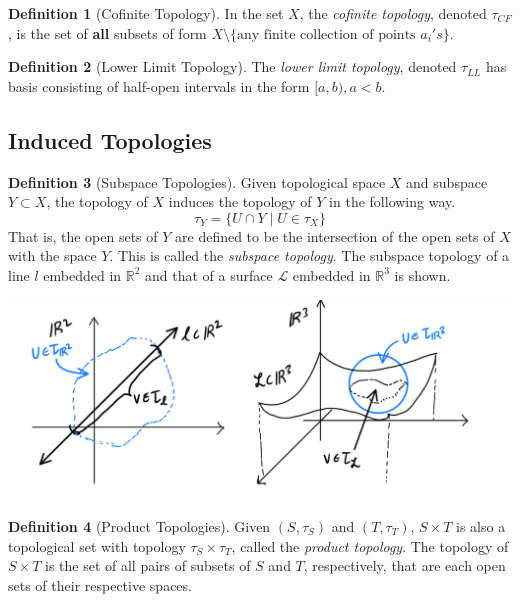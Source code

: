 \documentclass{article}
\theoremstyle{remark}
\theoremstyle{definition}
\newtheorem{definition}{Definition}[section]
\begin{document}
\begin{definition}[Cofinite Topology]
In the set $X$, the \textit{cofinite topology}, denoted $\tau_{CF}$, is the set of \textbf{all} subsets of form $X \setminus \{\text{any finite collection of points $a_{i}'s$}\}$. 
\end{definition}

\begin{definition}[Lower Limit Topology]
The \textit{lower limit topology}, denoted $\tau_{LL}$ has basis consisting of half-open intervals in the form $[a, b), a<b$. 
\end{definition}

\subsection{Induced Topologies}
\begin{definition}[Subspace Topologies]
Given topological space $X$ and subspace $Y \subset X$, the topology of $X$ induces the topology of $Y$ in the following way. 
\[\tau_Y = \{U \cap Y\;|\; U \in \tau_X\}\]
That is, the open sets of $Y$ are defined to be the intersection of the open sets of $X$ with the space $Y$. This is called the \textit{subspace topology}. The subspace topology of a line $l$ embedded in $\mathbb{R}^2$ and that of a surface $\mathcal{L}$ embedded in $\mathbb{R}^3$ is shown. 
\begin{center}
    \includegraphics[scale=0.25]{img/Subspace_Topology.PNG}
\end{center}
\end{definition}

\begin{definition}[Product Topologies]
Given $(S, \tau_{S})$ and $(T, \tau_{T})$, $S \times T$ is also a topological set with topology $\tau_S \times \tau_{T}$, called the \textit{product topology}. The topology of $S \times T$ is the set of all pairs of subsets of $S$ and $T$, respectively, that are each open sets of their respective spaces. 
\end{definition}
\end{document}
